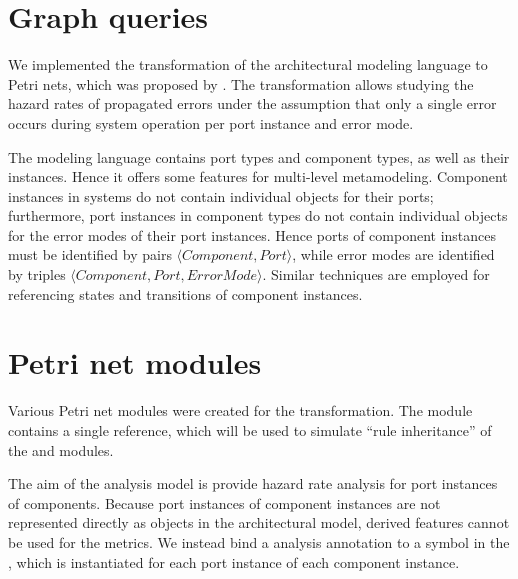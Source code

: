 \section{Graph queries}

We implemented the transformation of the architectural modeling language to Petri nets, which was proposed by \citet[Chapter~6]{Ecsedi16architecture}. The transformation allows studying the hazard rates of propagated errors under the assumption that only a single error occurs during system operation per port instance and error mode.

The modeling language contains port types and component types, as well as their instances. Hence it offers some features for multi-level metamodeling. Component instances in systems do not contain individual objects for their ports; furthermore, port instances in component types do not contain individual objects for the error modes of their port instances. Hence ports of component instances must be identified by pairs \(\langle \textit{Component}, \textit{Port} \rangle\), while error modes are identified by triples \(\langle \textit{Component}, \textit{Port}, \textit{ErrorMode} \rangle\). Similar techniques are employed for referencing states and transitions of component instances.



\section{Petri net modules}

Various Petri net modules were created for the transformation. The module  contains a single reference, which will be used to simulate \enquote{rule inheritance} of the  and  modules.

The aim of the analysis model is provide hazard rate analysis for port instances of components. Because port instances of component instances are not represented directly as objects in the architectural model, derived features cannot be used for the metrics. We instead bind a  analysis annotation to a symbol in the , which is instantiated for each port instance of each component instance.



